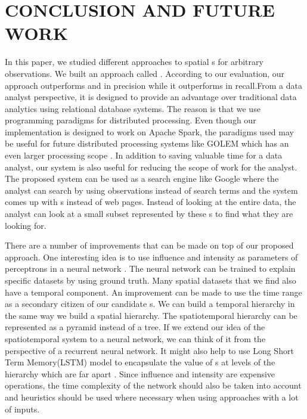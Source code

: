 \section{CONCLUSION AND FUTURE WORK}
\label{chp:concl}
In this paper, we studied different approaches to spatial {\explanation}s for arbitrary observations. We built an approach called {\solution}. According to our evaluation, our approach outperforms {\aggravation} and {\intervention} in precision while it outperforms {\aggravation} in recall.From a data analyst perspective, it is designed to provide an advantage over traditional data analytics using relational database systems. The reason is that we use programming paradigms for distributed processing. Even though our implementation is designed to work on Apache Spark, the paradigms used may be useful for future distributed processing systems like GOLEM which has an even larger processing scope \cite{golem2018}. In addition to saving valuable time for a data analyst, our system is also useful for reducing the scope of work for the analyst. The proposed system can be used as a search engine like Google where the analyst can search by using observations instead of search terms and the system comes up with {\explanation}s instead of web pages. Instead of looking at the entire data, the analyst can look at a small subset represented by these {\explanation}s to find what they are looking for.

There are a number of improvements that can be made on top of our proposed approach. One interesting idea is to use influence and intensity as parameters of perceptrons in a neural network \cite{grossberg1988nonlinear,widrow199030}. The neural network can be trained to explain specific datasets by using ground truth.
Many spatial datasets that we find also have a temporal component. An improvement can be made to use the time range as a secondary citizen of our candidate {\explanation}s. We can build a temporal hierarchy in the same way we build a spatial hierarchy. The spatiotemporal hierarchy can be represented as a pyramid instead of a tree.
If we extend our idea of the spatiotemporal system to a neural network, we can think of it from the perspective of a recurrent neural network\cite{chung2016hierarchical}. It might also help to use Long Short Term Memory(LSTM) model to encapsulate the value of {\explanation}s at levels of the hierarchy which are far apart \cite{hochreiter1997long}.
Since influence and intensity are expensive operations, the time complexity of the network should also be taken into account and heuristics should be used where necessary when using approaches with a lot of inputs.

